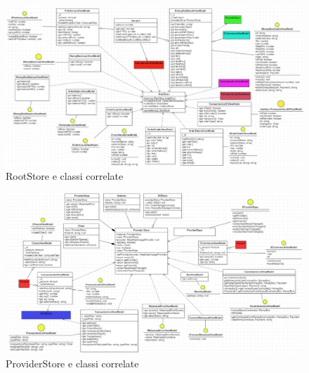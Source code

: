 \begin{landscape}
\begin{figure}[H]
    \begin{center}
    \includegraphics[scale=0.7]{immagini/rootstore.png}
    \caption{RootStore e classi correlate}
    \end{center}
\end{figure}
\end{landscape}

\begin{landscape}
    \begin{figure}[H]
        \begin{center}
        \includegraphics[scale=0.7]{immagini/providerstore.png}
        \caption{ProviderStore e classi correlate}
        \end{center}
    \end{figure}
\end{landscape}

